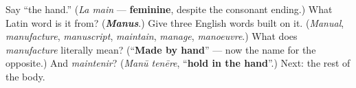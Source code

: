 \begin{tcolorbox}[breakable,colback=teal!4,colframe=teal!35!black,title={Before you move on}]
Say \textquotedblleft{}the hand.\textquotedblright{} (\emph{La main} — \textbf{feminine}, despite the consonant ending.) What Latin word is it from? (\emph{\textbf{Manus}}.) Give three English words built on it. (\emph{Manual}, \emph{manufacture}, \emph{manuscript}, \emph{maintain}, \emph{manage}, \emph{manoeuvre}.) What does \emph{manufacture} literally mean? (\textquotedblleft{}\textbf{Made by hand}\textquotedblright{} — now the name for the opposite.) And \emph{maintenir}? (\emph{Manū tenēre}, \textquotedblleft{}\textbf{hold in the hand}\textquotedblright{}.) Next: the rest of the body.
\end{tcolorbox}
